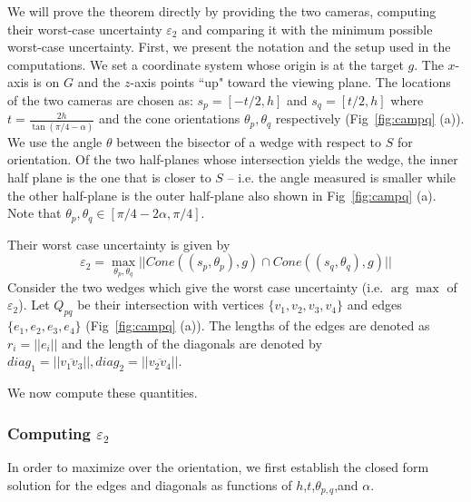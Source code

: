 We will prove the theorem directly by providing the two cameras, computing their worst-case uncertainty $\varepsilon_2$ and comparing it with the minimum possible worst-case uncertainty. 
First, we present the notation and the setup used in the computations.
We set a coordinate system whose origin is at the target $g$. The $x$-axis is on $G$ and the $z$-axis points ``up" toward the viewing plane.
The locations of the two cameras are chosen as:
 $s_p = [-t/2,h]$ and $s_q = [t/2,h]$ where $t = \frac{2h}{\tan(\pi/4-\alpha)}$ and the cone orientations $\theta_p, \theta_q$ respectively (Fig~\ref{fig:campq} (a)). We use the angle $\theta$ between the bisector of a wedge with respect to $S$ for orientation. Of the two half-planes whose intersection yields the wedge, the inner half plane is the one that is closer to $S$ -- i.e. the angle measured is smaller while the other half-plane is the outer half-plane also shown in Fig~\ref{fig:campq} (a). Note that $\theta_p,\theta_q \in [\pi/4-2\alpha,\pi/4]$.
 
Their worst case uncertainty is given by
\begin{equation}\label{eq:uncertainty2cam2d}
\varepsilon_2 = \max_{\theta_p,\theta_q}||Cone((s_p,\theta_p),g)\cap Cone((s_q,\theta_q),g)||
\end{equation}
Consider the two wedges which give the worst case uncertainty (i.e. $\arg \max$ of $\varepsilon_2$). 
Let $Q_{pq}$ be their intersection with vertices $\{v_1,v_2,v_3,v_4\}$ and  edges  $\{e_1,e_2,e_3,e_4\}$ (Fig~\ref{fig:campq} (a)).
The lengths of the edges are denoted as $r_i = ||e_i||$ and the length of the diagonals are denoted by $diag_1 = ||\overline{v_1v_3}||,diag_2 = ||\overline{v_2v_4}||$.

We now compute these quantities.

\subsubsection{Computing $\varepsilon_2$}
In order to maximize over the orientation, we first establish the closed form solution for the edges and diagonals as functions of $h$,$t$,$\theta_{p,q}$,and $\alpha$.

